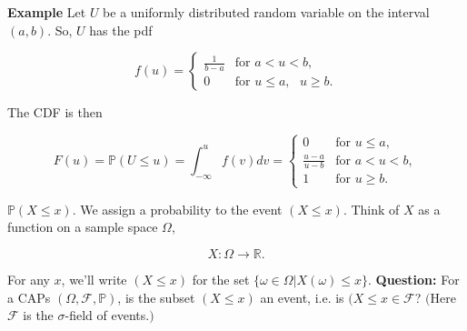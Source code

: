 \documentclass[12pt]{article}
\newcommand{\R}{\mathbb{R}}
\newcommand{\faps}{(\Omega, \field, \mathbb{P})}
\newcommand{\field}{\mathcal{F}}
\newcommand{\prob}[1]{\mathbb{P}(#1)}
\begin{document}
\begin{tcolorbox}
\textbf{Example} Let $U$ be a uniformly distributed random variable on the interval $(a,b)$. So, $U$ has the pdf

\[ f(u) =  \begin{cases} 
      \frac{1}{b-a} & \text{for } a < u < b, \\
      0 & \text{for } u \leq a, \text{ } u \geq b.
      \end{cases} \]
 
\begin{center}
\end{center}

\noindent
The CDF is then 

\[ F(u) = \prob{U \leq u} = \int_{- \infty}^{u} f(v) dv =  \begin{cases} 
	  0 & \text{for } u \leq a, \\
      \frac{u-a}{u-b} & \text{for } a < u < b, \\
      1 & \text{for } u \geq b.
      \end{cases} \]
      
\end{tcolorbox}

\noindent
$\prob{X \leq x}$. We assign a probability to the event $(X \leq x)$. Think of $X$ as a function on a sample space $\Omega$,

\begin{equation*}
X : \Omega \rightarrow \R.
\end{equation*}


\noindent
For any $x$, we'll write $(X \leq x)$ for the set $\big \{ \omega \in \Omega \lvert X(\omega) \leq x \big \}$. \textbf{Question:} For a CAPs $\faps$, is the subset $(X \leq x)$ an event, i.e. is $(X \leq x \in \field$? $($Here $\field$ is the $\sigma$-field of events.$)$ 
\end{document}
